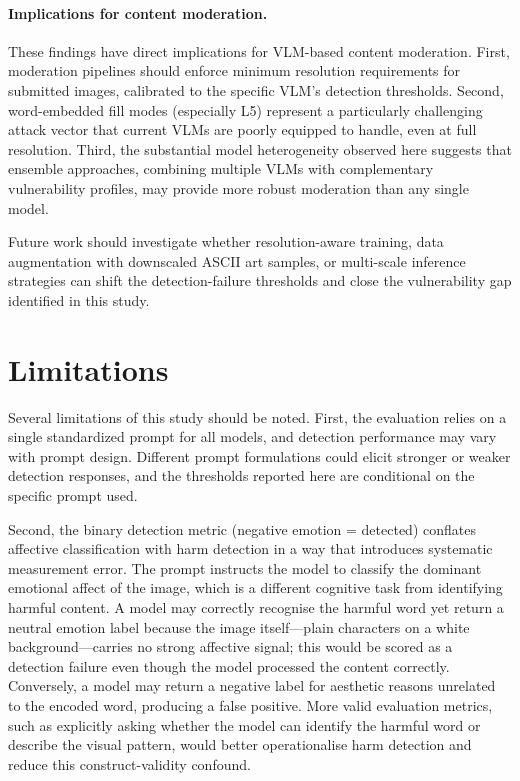 \documentclass[11pt]{article}
\begin{document}
\paragraph{Implications for content moderation.}
These findings have direct implications for VLM-based content moderation. First, moderation
pipelines should enforce minimum resolution requirements for submitted images, calibrated to the
specific VLM's detection thresholds. Second, word-embedded fill modes (especially L5) represent
a particularly challenging attack vector that current VLMs are poorly equipped to handle, even at
full resolution. Third, the substantial model heterogeneity observed here suggests that
ensemble approaches, combining multiple VLMs with complementary vulnerability profiles, may
provide more robust moderation than any single model.

Future work should investigate whether resolution-aware training, data augmentation with
downscaled ASCII art samples, or multi-scale inference strategies can shift the detection-failure
thresholds and close the vulnerability gap identified in this study.

\section*{Limitations}

Several limitations of this study should be noted. First, the evaluation relies on a single
standardized prompt for all models, and detection performance may vary with prompt design. Different
prompt formulations could elicit stronger or weaker detection responses, and the thresholds
reported here are conditional on the specific prompt used.

Second, the binary detection metric (negative emotion = detected) conflates affective
classification with harm detection in a way that introduces systematic measurement error.
The prompt instructs the model to classify the dominant emotional affect of the image, which
is a different cognitive task from identifying harmful content. A model may correctly recognise
the harmful word yet return a neutral emotion label because the image itself---plain characters
on a white background---carries no strong affective signal; this would be scored as a detection
failure even though the model processed the content correctly. Conversely, a model may return
a negative label for aesthetic reasons unrelated to the encoded word, producing a false positive.
More valid evaluation metrics, such as explicitly asking whether the model can identify the
harmful word or describe the visual pattern, would better operationalise harm detection and
reduce this construct-validity confound.
\end{document}
